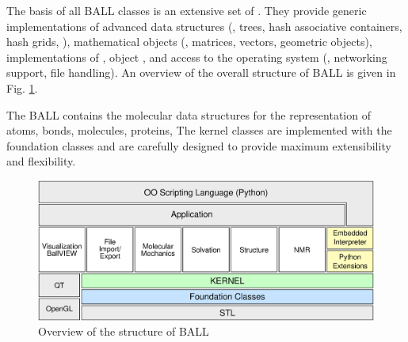 The basis of all BALL classes is an extensive set of .  They provide generic implementations of advanced data structures
(\eg, trees, hash associative containers, hash grids, \etc), mathematical
objects (\eg, matrices, vectors, geometric objects), implementations of
, object , and access to the
operating system (\eg, networking support, file handling). An overview of the
overall structure of BALL is given in Fig. \ref{fig:BALL_structure}.

The BALL  contains the molecular data structures for the
representation of atoms, bonds, molecules, proteins, \etc  The kernel classes
are implemented with the foundation classes and are carefully designed to
provide maximum extensibility and flexibility.
\begin{figure}[tb]
  \centering\includegraphics[width=\textwidth]{BALL_structure.eps}
  \caption{Overview of the structure of BALL}
  \label{fig:BALL_structure}
\end{figure}

